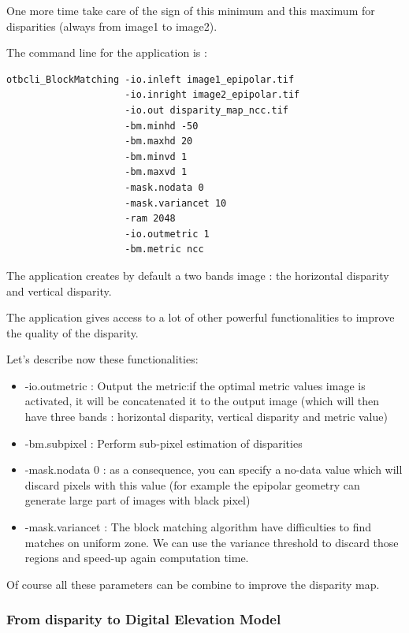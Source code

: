 One more time take care of the sign of this minimum and this maximum for
disparities (always from image1 to image2).

The command line for the  application is :
\begin{verbatim}
otbcli_BlockMatching -io.inleft image1_epipolar.tif
                     -io.inright image2_epipolar.tif
                     -io.out disparity_map_ncc.tif
                     -bm.minhd -50
                     -bm.maxhd 20
                     -bm.minvd 1
                     -bm.maxvd 1
                     -mask.nodata 0
                     -mask.variancet 10
                     -ram 2048
                     -io.outmetric 1
                     -bm.metric ncc
\end{verbatim}

The application creates by default a two bands image : the horizontal disparity
and vertical disparity.

The  application gives access to a lot of other
powerful functionalities to improve the quality of the disparity.

Let's describe now these functionalities:

\begin{itemize}
\item -io.outmetric : Output the metric:if the optimal metric values image is
  activated, it will be concatenated it to the output image (which will then
  have three bands : horizontal disparity, vertical disparity and metric value)
\item -bm.subpixel : Perform sub-pixel estimation of disparities
\item -mask.nodata 0 : as a consequence, you can specify a no-data value which
  will discard pixels with this value (for example the epipolar geometry can
  generate large part of images with black pixel)
\item -mask.variancet : The block matching algorithm have difficulties to find
  matches on uniform zone. We can use the variance threshold to discard those
  regions and speed-up again computation time.
\end{itemize}

Of course all these parameters can be combine to improve the disparity map.

\subsubsection{From disparity to Digital Elevation Model}


